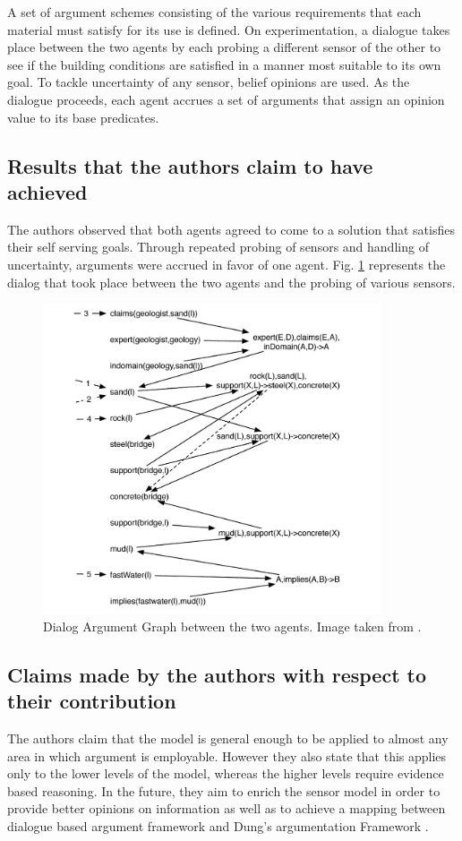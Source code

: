 \documentclass[UTF8]{article}
\begin{document}
A set of argument schemes consisting of the various requirements that each material must satisfy for its use is defined. On experimentation, a dialogue takes place 
between the two agents by each probing a different sensor of the other to see if the building conditions are satisfied in a manner most suitable to its 
own goal. To tackle uncertainty of any sensor, belief opinions are used. As the dialogue proceeds, each agent accrues a set of arguments that assign an opinion 
value to its base predicates.

\subsection{Results that the authors claim to have achieved}
The authors observed that both agents agreed to come to a solution that satisfies their self serving goals. Through repeated probing of sensors and 
handling of uncertainty, arguments were accrued in favor of one agent. Fig. \ref{fig:fig1} represents the dialog that took place between the two agents and the probing of various sensors.

\begin{figure}
  \centering
  \includegraphics[width=10cm]{dialog}
  \caption{Dialog Argument Graph between the two agents. Image taken from \cite{OREN2007838}.}
  \label{fig:fig1}
\end{figure}

\subsection{Claims made by the authors with respect to their contribution}
The authors claim that the model is general enough to be applied to almost any area in which argument is employable. However they also state that 
this applies only to the lower levels of the model, whereas the higher levels require evidence based reasoning. In the future, they aim to enrich the sensor model 
in order to provide better opinions on information as well as to achieve a mapping between dialogue based argument framework and Dung's argumentation Framework \cite{DUNG1995321}.
\end{document}
